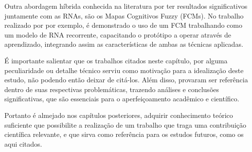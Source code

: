 Outra abordagem híbrida conhecida na literatura por ter resultados significativos juntamente com as RNAs, são os Mapas Cognitivos Fuzzy (FCMs). No trabalho realizado por  por exemplo, é demonstrado o uso de um FCM trabalhando como um modelo de RNA recorrente, capacitando o protótipo a operar através de aprendizado, integrando assim as características de ambas as técnicas aplicadas.

É importante salientar que os trabalhos citados neste capítulo, por alguma peculiaridade ou detalhe técnico serviu como motivação para a idealização deste estudo, não podendo então deixar de citá-los. Além disso, provaram ser referência dentro de suas respectivas problemáticas, trazendo análises e conclusões significativas, que são essenciais para o aperfeiçoamento acadêmico e científico.

Portanto é almejado nos capítulos posteriores, adquirir conhecimento teórico suficiente que possibilite a realização de um trabalho que  traga uma contribuição científica relevante, e que sirva como referência para os estudos futuros, como os aqui citados.